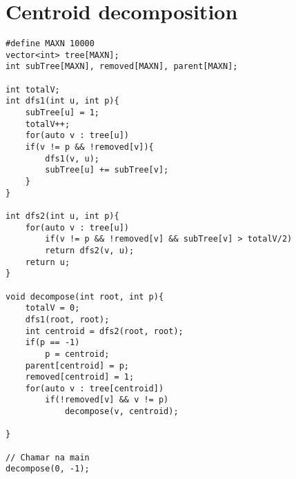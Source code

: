 \section{Centroid decomposition}

\begin{multicols}{2}
	\begin{lstlisting}
#define MAXN 10000
vector<int> tree[MAXN];
int subTree[MAXN], removed[MAXN], parent[MAXN];

int totalV;
int dfs1(int u, int p){
	subTree[u] = 1;
	totalV++;
	for(auto v : tree[u])
	if(v != p && !removed[v]){
		dfs1(v, u);
		subTree[u] += subTree[v];
	}
}

int dfs2(int u, int p){
	for(auto v : tree[u])
		if(v != p && !removed[v] && subTree[v] > totalV/2)
		return dfs2(v, u);
	return u;
}

void decompose(int root, int p){
	totalV = 0;
	dfs1(root, root);
	int centroid = dfs2(root, root);
	if(p == -1)
		p = centroid;
	parent[centroid] = p;
	removed[centroid] = 1;
	for(auto v : tree[centroid])
		if(!removed[v] && v != p)
			decompose(v, centroid);
	
}

// Chamar na main
decompose(0, -1);
\end{lstlisting}
\end{multicols}

